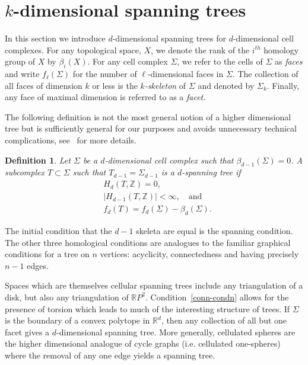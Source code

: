 \documentclass{amsart}
\newcommand{\R}{{\mathbb R}}
\newtheorem{defin}{Definition}
\begin{document}
\section{$k$-dimensional spanning trees}

In this section we introduce $d$-dimensional spanning trees for
$d$-dimensional cell complexes.  For any topological space, $X$, we
denote the rank of the $i^{th}$ homology group of $X$ by
$\beta_i(X)$. For any cell complex $\Sigma$, we refer to the cells of
$\Sigma$ as \emph{faces} and write $f_{\ell}(\Sigma)$ for the number of
$\ell$-dimensional faces in $\Sigma$.  The collection of all faces of
dimension $k$ or less is the \emph{$k$-skeleton} of $\Sigma$ and
denoted by $\Sigma_k$.  Finally, any face of maximal dimension is
referred to as a \emph{facet}.

The following definition is not the most general notion of a higher
dimensional tree but is sufficiently general for our purposes and
avoids unnecessary technical complications, see~\cite{chapter} for
more details.

\begin{defin}
Let $\Sigma$ be a $d$-dimensional cell complex such that $\beta_{d-1}(\Sigma) = 0$. A subcomplex $T \subset \Sigma$ such that $T_{d-1} = \Sigma_{d-1}$ is a \emph{$d$-spanning tree} if
  \begin{subequations}
  \begin{align}
  \label{acyc-condn}  & H_d(T, \mathbb{Z}) = 0,\\
  \label{conn-condn}  & |H_{d-1}(T, \mathbb{Z})| < \infty, \quad\text{and}\\
  \label{count-condn} & f_d(T) = f_d(\Sigma) - \beta_d(\Sigma).
  \end{align}
  \end{subequations}
\end{defin}


The initial condition that the $d-1$ skeleta are equal is the spanning
condition.  The other three homological conditions are analogues to
the familiar graphical conditions for a tree on $n$ vertices:
acyclicity, connectedness and having precisely $n-1$ edges.

Spaces which are themselves cellular spanning trees include any
triangulation of a disk, but also any triangulation of ${\R}P^2$.
Condition~\ref{conn-condn} allows for the presence of torsion which leads to much of the interesting structure of trees.  If
$\Sigma$ is the boundary of a convex polytope in $\mathbb{R}^d$, then any collection of all but
one facet gives a $d$-dimensional spanning tree.  More generally,
cellulated spheres are the higher dimensional analogue of cycle graphs (i.e. cellulated one-spheres)
where the removal of any one edge yields a spanning tree. 
\end{document}
